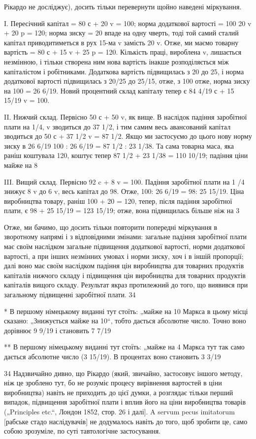 Рікардо не досліджує), досить тільки перевернути щойно наведені
міркування.

I. Пересічний капітал = 80 с + 20 v = 100; норма додаткової
вартості = 100%
20 v + 20 p = 120; норма зиску = 20%
впаде на одну чверть, тоді той самий сталий капітал приводитиметься
в рух 15-ма v замість 20 v. Отже, ми маємо товарну
вартість = 80 с + 15 v + 25 p = 120. Кількість праці, вироблена v,
лишається  незмінною, і тільки створена ним нова вартість інакше
розподіляється між капіталістом і робітниками. Додаткова вартість
підвищилась з 20 до 25, і норма додаткової вартості
підвищилась з 20/25 до 25/15, отже, з 100%
отже, норма зиску на 100 = 26 6/19. Новий процентний склад
капіталу тепер є 84 4/19 с + 15 15/19 v = 100.

II. Нижчий склад. Первісно 50 с + 50 v, як вище. В наслідок
падіння заробітної плати на 1/4, v зводиться до 37 1/2, і тим самим
весь авансований капітал зводиться до 50 с + 37 1/2 v = 87 1/2. Якщо
ми застосуємо до цього нову норму зиску в 26 6/19%
100 : 26 6/19 = 87 1/2 : 23 1/38. Та сама товарна маса, яка раніш коштувала
120, коштує тепер 87 1/2 + 23 1/38 = 110 10/19; падіння ціни майже на 8%

III. Вищий склад. Первісно 92 c + 8 v = 100. Падіння заробітної
плати на 1 /4 знижує 8 v до 6 v, весь капітал до 98. Отже,
100: 26 6/19 = 98: 25 15/19. Ціна виробництва товару, раніш 100 + 20 = 120,
тепер, після падіння заробітної плати, є 98 + 25 15/19 = 123 15/19;
отже, вона підвищилась більше ніж на 3%

Отже, ми бачимо, що досить тільки повторити попередні міркування в зворотному напрямі і з
відповідними змінами: загальне падіння заробітної плати має своїм наслідком загальне підвищення
додаткової вартості, норми додаткової вартості, а при інших незмінних умовах і норми зиску, хоч і в
іншій пропорції; далі воно має своїм наслідком падіння цін виробництва для товарних продуктів
капіталів нижчого складу і підвищення цін виробництва для товарних продуктів капіталів вищого
складу. Результат якраз протилежний до того, що  виявився при загальному підвищенні заробітної
плати. 34

* В першому німецькому виданні тут стоїть: „майже на 10%
Маркса в цьому місці сказано: „Знижується майже на 10“, тобто дається абсолютне число. Точно воно
дорівнює 9 9/19 і становить 7 7/19%

** В першому німецькому виданні тут стоїть: „майже на 4%
Маркса тут так само дається абсолютне число (3 15/19). В процентах воно становить
3 3/19%

34 Надзвичайно дивно, що Рікардо (який, звичайно, застосовує іншого
методу, ніж це зроблено тут, бо не розуміє процесу вирівнення вартостей в ціни виробництва) навіть
не приходить до цієї думки, а розглядає тільки перший випадок, підвищення заробітної плати і вплив
його на ціни виробництва товарів („Principles etc.“, Лондон 1852, стор. 26 і далі]. A servum pecus
imitatorum [рабське стадо наслідувачів] не додумалось навіть до того, щоб зробити
це, само собою зрозуміле, по суті тавтологічне застосування.
